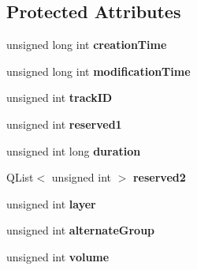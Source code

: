 \subsection*{Protected Attributes}
\begin{DoxyCompactItemize}
\item 
\hypertarget{class_track_header_box_a820535262bfbc40be018c8378fecd727}{unsigned long int {\bfseries creation\-Time}}\label{class_track_header_box_a820535262bfbc40be018c8378fecd727}

\item 
\hypertarget{class_track_header_box_a47eb597f8089c7f5d339c0ad528de7f2}{unsigned long int {\bfseries modification\-Time}}\label{class_track_header_box_a47eb597f8089c7f5d339c0ad528de7f2}

\item 
\hypertarget{class_track_header_box_ad0f154d870d0d0c4dee180a235f090ba}{unsigned int {\bfseries track\-I\-D}}\label{class_track_header_box_ad0f154d870d0d0c4dee180a235f090ba}

\item 
\hypertarget{class_track_header_box_a584fda317907bcd5a634fb5a7e83eae0}{unsigned int {\bfseries reserved1}}\label{class_track_header_box_a584fda317907bcd5a634fb5a7e83eae0}

\item 
\hypertarget{class_track_header_box_ae2605055267d9ec7c60d4a2ea67f920c}{unsigned int long {\bfseries duration}}\label{class_track_header_box_ae2605055267d9ec7c60d4a2ea67f920c}

\item 
\hypertarget{class_track_header_box_a2d887f0a0751cf3e0ecd907a1a28043c}{Q\-List$<$ unsigned int $>$ {\bfseries reserved2}}\label{class_track_header_box_a2d887f0a0751cf3e0ecd907a1a28043c}

\item 
\hypertarget{class_track_header_box_a15055fe6607f4eda55a568945589951e}{unsigned int {\bfseries layer}}\label{class_track_header_box_a15055fe6607f4eda55a568945589951e}

\item 
\hypertarget{class_track_header_box_a76876ee7eefd7142c7b33571c75411b4}{unsigned int {\bfseries alternate\-Group}}\label{class_track_header_box_a76876ee7eefd7142c7b33571c75411b4}

\item 
\hypertarget{class_track_header_box_a142a97141e1e2da6f3fdf166d099858b}{unsigned int {\bfseries volume}}\label{class_track_header_box_a142a97141e1e2da6f3fdf166d099858b}


\end{DoxyCompactItemize}
